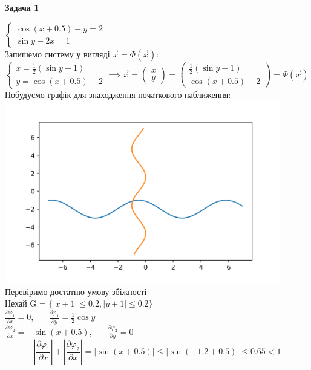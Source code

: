 \documentclass[14 pt]{extarticle}
\begin{document}
\begin{center}
    \large
    \textbf{Задача 1}
\end{center}
$
\begin{cases}
\cos{(x+0.5)} - y = 2 \\
\sin{y} - 2x = 1
\end{cases}
$
\\ 
Запишемо систему у вигляді $\vec{x} = \Phi(\vec{x})$: \\ 
$
\begin{cases}
x = \frac12 (\sin{y}-1)\\
y=\cos{(x+0.5)} - 2
\end{cases} \implies
 \vec{x} =
\begin{pmatrix}
x \\ y
\end{pmatrix} =
\begin{pmatrix}
\frac12 (\sin{y}-1) \\
\cos{(x+0.5)} - 2
\end{pmatrix} = \Phi(\vec{x})
$ \\ 
Побудуємо графік для знаходження початкового наближення:\\ 
\includegraphics[width=12cm]{plot.png}
\ \\ 
Перевіримо достатню умову збіжності\\ 
Нехай G = $\{ |x + 1| \leq 0.2, |y + 1| \leq 0.2 \}$ \\ 
$\frac{\partial \varphi_1}{\partial x } =  0$, \ \ \ 
$\frac{\partial \varphi_1}{\partial y } =  \frac{1}{2} \cos{y}$ \\ 
$\frac{\partial \varphi_2}{\partial x } =  - \sin{(x+0.5)}$, \ \ \  
$\frac{\partial \varphi_2}{\partial y } =  0$ \\
$$
\left| \frac{\partial \varphi_1}{\partial x } \right| 
+ \left| \frac{\partial \varphi_2}{\partial x } \right| 
= |\sin{(x+0.5)}| \leq |\sin{(-1.2+0.5)}| \leq 0.65 < 1
$$
\end{document}
